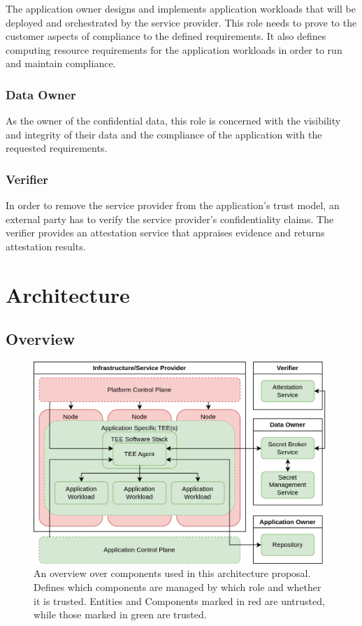 The application owner designs and implements application workloads that will be
deployed and orchestrated by the service provider. This role needs to prove to
the customer aspects of compliance to the defined requirements. It also defines
computing resource requirements for the application workloads in order to run
and maintain compliance.

\subsubsection{Data Owner}

As the owner of the confidential data, this role is concerned with the
visibility and integrity of their data and the compliance of the application
with the requested requirements.

\subsubsection{Verifier}

In order to remove the service provider from the application's trust model, an
external party has to verify the service provider's confidentiality claims. The
verifier provides an attestation service that appraises evidence and returns
attestation results.

\section{Architecture}
\label{sec:proposal:architecture}

\subsection{Overview}

\begin{figure}
  \centering
  \includegraphics[width=\linewidth]{resources/architecture-overview.png}
  \caption[A simplified overview over the Confidential Containers architecture]{
    An overview over components used in this architecture proposal. Defines
    which components are managed by which role and whether it is trusted.
    Entities and Components marked in red are untrusted, while those marked in
    green are trusted.}
  \label{fig:proposal:architecture-overview}
\end{figure}

